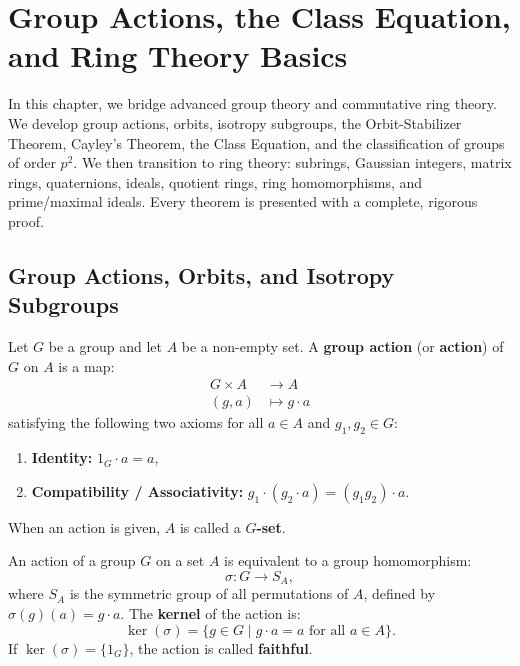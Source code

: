 \chapter{Group Actions, the Class Equation, and Ring Theory Basics}
\label{chap:unit4}

In this chapter, we bridge advanced group theory and commutative ring theory. We develop group actions, orbits, isotropy subgroups, the Orbit-Stabilizer Theorem, Cayley's Theorem, the Class Equation, and the classification of groups of order $p^2$. We then transition to ring theory: subrings, Gaussian integers, matrix rings, quaternions, ideals, quotient rings, ring homomorphisms, and prime/maximal ideals. Every theorem is presented with a complete, rigorous proof.

\section{Group Actions, Orbits, and Isotropy Subgroups}
\label{sec:group_actions}

\begin{definition}
Let $G$ be a group and let $A$ be a non-empty set. A \textbf{group action} (or \textbf{action}) of $G$ on $A$ is a map:
\begin{align}
G \times A &\longrightarrow A \\
(g, a) &\longmapsto g \cdot a
\end{align}
satisfying the following two axioms for all $a \in A$ and $g_1, g_2 \in G$:
\begin{enumerate}[label=\textbf{(\arabic*)}, leftmargin=*, itemsep=4pt]
    \item \textbf{Identity:} $1_G \cdot a = a$,
    \item \textbf{Compatibility / Associativity:} $g_1 \cdot (g_2 \cdot a) = (g_1 g_2) \cdot a$.
\end{enumerate}
When an action is given, $A$ is called a \textbf{$G$-set}.
\end{definition}

\begin{proposition}
\label{prop:perm_rep}
An action of a group $G$ on a set $A$ is equivalent to a group homomorphism:
\begin{equation}
\sigma: G \longrightarrow S_A,
\end{equation}
where $S_A$ is the symmetric group of all permutations of $A$, defined by $\sigma(g)(a) = g \cdot a$.
The \textbf{kernel} of the action is:
\begin{equation}
\ker(\sigma) = \{ g \in G \mid g \cdot a = a \text{ for all } a \in A \}.
\end{equation}
If $\ker(\sigma) = \{1_G\}$, the action is called \textbf{faithful}.
\end{proposition}

